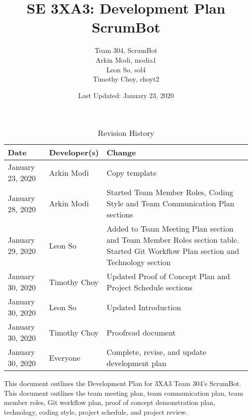 \documentclass{article}
\title{SE 3XA3: Development Plan\\ScrumBot}
\author{
    Team 304, ScrumBot
        \\ Arkin Modi, modia1
        \\ Leon So, sol4
        \\ Timothy Choy, choyt2
}
\date{Last Updated: January 23, 2020}
\begin{document}
\begin{table}[hp]
    \caption{Revision History} \label{TblRevisionHistory}
    \begin{tabularx}{\textwidth}{llX}
        \toprule
            \textbf{Date} & \textbf{Developer(s)} & \textbf{Change}\\
        \midrule
            January 23, 2020 & Arkin Modi & Copy template\\
            January 28, 2020 & Arkin Modi & Started Team Member Roles, Coding Style and Team Communication Plan sections\\
            January 29, 2020 & Leon So & Added to Team Meeting Plan section and Team Member Roles section table. Started Git Workflow Plan section and Technology section\\
            January 30, 2020 & Timothy Choy & Updated Proof of Concept Plan and Project Schedule sections\\
            January 30, 2020 & Leon So & Updated Introduction\\
            January 30, 2020 & Timothy Choy & Proofread document\\
            January 30, 2020 & Everyone & Complete, revise, and update development plan\\
        \bottomrule
    \end{tabularx}
\end{table}

\newpage

\maketitle

\noindent This document outlines the Development Plan for 3XA3 Team 304's ScrumBot. This document outlines the team meeting plan, team communication plan, team member roles, Git workflow plan, proof of concept demonstration plan, technology, coding style, project schedule, and project review.
\end{document}
